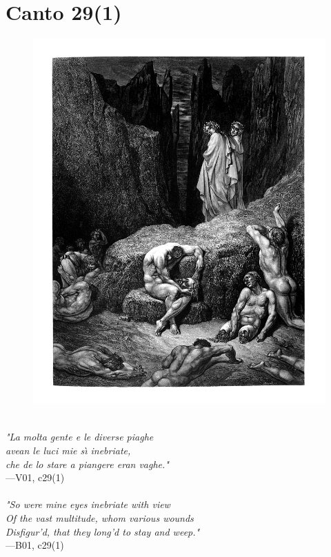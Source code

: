 \documentclass[../Dore_vision.tex]{subfiles}
\begin{document}
\newpage

\section{Canto 29(1)}

\begin{figure}[ht]
\centering
\includegraphics[height=\figsize]{illustrations/book_1/V01, c29(1).jpg}
\end{figure}

\begin{center}
\begin{minipage}{0.8\linewidth}
\textit{\\
"La molta gente e le diverse piaghe\\avean le luci mie s\`{\i} inebriate,\\che de lo stare a piangere eran vaghe."} \\
—V01, c29(1) \\~\\
\textit{"So were mine eyes inebriate with view\\Of the vast multitude, whom various wounds\\Disfigur'd, that they long'd to stay and weep."} \\
—B01, c29(1)
\end{minipage}
\end{center}
\end{document}
